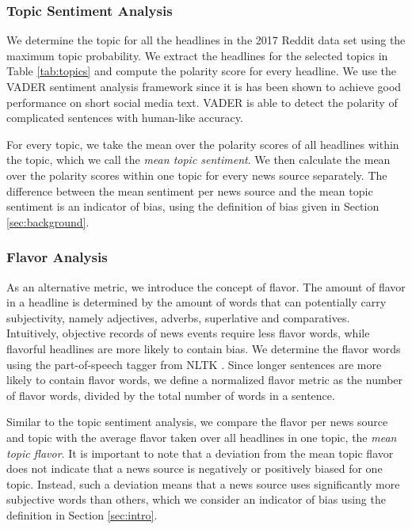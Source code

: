 \documentclass[final]{ieee}
\begin{document}
\subsubsection{Topic Sentiment Analysis}\label{sec:topic sent}

We determine the topic for all the headlines in the 2017 Reddit data set using the maximum topic probability. We extract the headlines for the selected topics in Table \ref{tab:topics} and compute the polarity score for every headline. We use the VADER sentiment analysis framework \cite{VAD14} since it is has been shown to achieve good performance on short social media text. VADER is able to detect the polarity of complicated sentences with human-like accuracy.

For every topic, we take the mean over the polarity scores of all headlines within the topic, which we call the \textit{mean topic sentiment}. We then calculate the mean over the polarity scores within one topic for every news source separately. The difference between the mean sentiment per news source and the mean topic sentiment is an indicator of bias, using the definition of bias given in Section \ref{sec:background}.

\subsubsection{Flavor Analysis}\label{sec:flavor}

As an alternative metric, we introduce the concept of flavor. The amount of flavor in a headline is determined by the amount of words that can potentially carry subjectivity, namely adjectives, adverbs, superlative and comparatives. Intuitively, objective records of news events require less flavor words, while flavorful headlines are more likely to contain bias. We determine the flavor words using the part-of-speech tagger from NLTK \cite{NLTK09}. Since longer sentences are more likely to contain flavor words, we define a normalized flavor metric as the number of flavor words, divided by the total number of words in a sentence.

Similar to the topic sentiment analysis, we compare the flavor per news source and topic with the average flavor taken over all headlines in one topic, the \textit{mean topic flavor}. It is important to note that a deviation from the mean topic flavor does not indicate that a news source is negatively or positively biased for one topic. Instead, such a deviation means that a news source uses significantly more subjective words than others, which we consider an indicator of bias using the definition in Section \ref{sec:intro}. 
\end{document}
